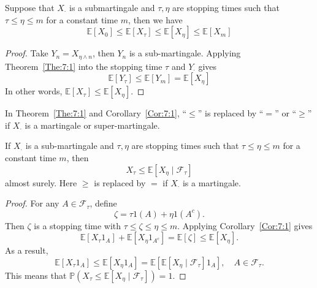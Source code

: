 \begin{corollary}\label{Cor:7:1}
Suppose that  $X_{\cdot}$ is a submartingale and $\tau,\eta$ are stopping times such that $\tau\le\eta\le m$ for a constant time $m$, then we have
\[
\mathbb{E}[X_0]\le \mathbb{E}[X_\tau]\le \mathbb{E}[X_\eta]\le\mathbb{E}[X_m]
\]
\end{corollary}

\begin{proof}
Take $Y_n = X_{\eta\land n}$, then $Y_n$ is a sub-martingale.
Applying Theorem~\ref{The:7:1} into the stopping time $\tau$ and $Y_{\cdot}$ gives 
\[
\mathbb{E}[Y_{\tau}]\le \mathbb{E}[Y_{m}]=\mathbb{E}[X_\eta]
\]
In other words, $\mathbb{E}[X_{\tau}]\le \mathbb{E}[X_\eta]$.
\end{proof}


\begin{remark}
In Theorem~\ref{The:7:1} and Corollary~\ref{Cor:7:1},
``$\le$'' is replaced by ``$=$'' or ``$\ge$''
if
$X_{\cdot}$ is a martingale or super-martingale.
\end{remark}

\begin{theorem}
If $X_{\cdot}$ is a sub-martingale and $\tau,\eta$ are stopping times such that $\tau\le\eta\le m$ for a constant time $m$, then
\[
X_\tau\le \mathbb{E}[X_\eta\mid\mathcal{F}_\tau]
\]
almost surely.
Here $\ge$ is replaced by $=$ if $X_{\cdot}$ is a martingale.
\end{theorem}
\begin{proof}
For any $A\in\mathcal{F}_\tau$, define
\[
\zeta = \tau1(A) + \eta1(A^c).
\]
Then $\zeta$ is a stopping time with $\tau\le\zeta\le\eta\le m$.
Applying Corollary~\ref{Cor:7:1} gives 
\[
\mathbb{E}[X_\tau1_A]+\mathbb{E}[X_\eta1_{A^c}] = \mathbb{E}[\zeta]\le  \mathbb{E}[X_\eta].
\]
As a result,
\[
\mathbb{E}[X_\tau1_A]\le \mathbb{E}[X_\eta1_A]=\mathbb{E}[\mathbb{E}[X_\eta\mid\mathcal{F}_\tau]1_A],\quad A\in\mathcal{F}_\tau.
\]
This means that $\mathbb{P}(X_\tau\le \mathbb{E}[X_\eta\mid\mathcal{F}_\tau])=1$.
\end{proof}


